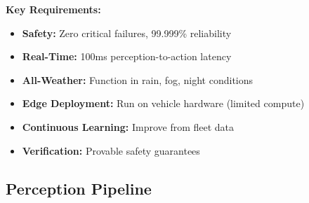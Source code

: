 \textbf{Key Requirements:}

\begin{itemize}
    \item \textbf{Safety:} Zero critical failures, 99.999\% reliability
    \item \textbf{Real-Time:} 100ms perception-to-action latency
    \item \textbf{All-Weather:} Function in rain, fog, night conditions
    \item \textbf{Edge Deployment:} Run on vehicle hardware (limited compute)
    \item \textbf{Continuous Learning:} Improve from fleet data
    \item \textbf{Verification:} Provable safety guarantees
\end{itemize}

\subsection{Perception Pipeline}

